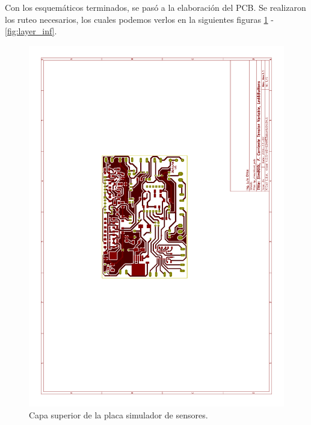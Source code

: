 Con los esquemáticos terminados, se pasó a la elaboración del PCB. Se realizaron los ruteo necesarios, los cuales podemos verlos en la siguientes figuras \ref{fig:layer_sup} - \ref{fig:layer_inf}.
\begin{figure}[!hp]
  \centering
  \includegraphics[page=1,angle=270,clip,trim=5.5cm 10cm 7.7cm 8.5cm]{./Figures/pcb_layer.pdf}
  \caption{Capa superior de la placa simulador de sensores.}
  \label{fig:layer_sup}
\end{figure}
